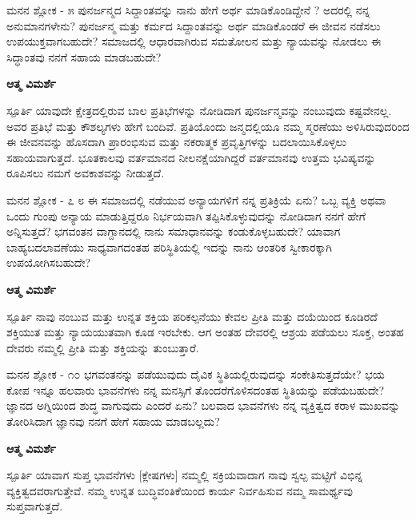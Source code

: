 \newpage
\begin{mananam}{\mananamfont \large ಮನನ ಶ್ಲೋಕ - ೫}
\footnotesize \mananamtext ಪುನರ್ಜನ್ಮದ ಸಿದ್ದಾಂತವನ್ನು ನಾನು ಹೇಗೆ ಅರ್ಥ ಮಾಡಿಕೊಂಡಿದ್ದೇನೆ ? ಅದರಲ್ಲಿ ನನ್ನ ಅನುಮಾನಗಳೇನು?  ಪುನರ್ಜನ್ಮ ಮತ್ತು ಕರ್ಮದ ಸಿದ್ದಾಂತವನ್ನು ಅರ್ಥ ಮಾಡಿಕೊಂಡರೆ ಈ ಜೀವನ ನಡೆಸಲು ಉಪಯುಕ್ತವಾಗಬಹುದೇ? ಸಮಾಜದಲ್ಲಿ ಆಧಾರವಾಗಿರುವ ಸಮತೋಲನ ಮತ್ತು ನ್ಯಾಯವನ್ನು ನೋಡಲು ಈ ಸಿದ್ಧಾಂತವು ನನಗೆ ಸಹಾಯ ಮಾಡಬಹುದೇ?
\end{mananam}
\WritingHand\enspace\textbf{ಆತ್ಮ ವಿಮರ್ಶೆ}\\
\begin{inspiration}{\mananamfont \large ಸ್ಪೂರ್ತಿ}
\footnotesize \mananamtext ಯಾವುದೇ ಕ್ಷೇತ್ರದಲ್ಲಿರುವ ಬಾಲ ಪ್ರತಿಭೆಗಳನ್ನು ನೋಡಿದಾಗ ಪುನರ್ಜನ್ಮವನ್ನು ನಂಬುವುದು ಕಷ್ಟವೇನಲ್ಲ. ಅವರ ಪ್ರತಿಭೆ ಮತ್ತು ಕೌಶಲ್ಯಗಳು ಹೇಗೆ ಬಂದಿವೆ. ಪ್ರತಿಯೊಂದು ಜನ್ಮದಲ್ಲಿಯೂ ನಮ್ಮ ಸ್ಮರಣೆಯು ಅಳಿಸಿರುವುದರಿಂದ ಈ ಜೀವನವನ್ನು ಹೊಸದಾಗಿ ಪ್ರಾರಂಭಿಸುವ ಮತ್ತು ನಕರಾತ್ಮಕ ಪ್ರವೃತ್ತಿಗಳನ್ನು ಬದಲಾಯಿಸಿಕೊಳ್ಳಲು ಸಹಾಯವಾಗುತ್ತದೆ. ಭೂತಕಾಲವು ವರ್ತಮಾನದ ನೀಲನಕ್ಷೆಯಾಗಿದ್ದರೆ ವರ್ತಮಾನವು ಉತ್ತಮ ಭವಿಷ್ಯವನ್ನು ರೂಪಿಸಲು ನಮಗೆ ಅವಕಾಶವನ್ನು ನೀಡುತ್ತದೆ.\\
\end{inspiration}
\newpage
\newpage
\begin{mananam}{\mananamfont \large ಮನನ ಶ್ಲೋಕ - ೭ ೮}
\footnotesize \mananamtext ಈ ಸಮಾಜದಲ್ಲಿ ನಡೆಯುವ ಅನ್ಯಾಯಗಳಿಗೆ ನನ್ನ ಪ್ರತಿಕ್ರಿಯೆ ಏನು? ಒಬ್ಬ ವ್ಯಕ್ತಿ ಅಥವಾ ಒಂದು ಗುಂಪು ಅನ್ಯಾಯ ಮಾಡುತ್ತಿದ್ದರೂ ನಿರ್ಭಯವಾಗಿ ತಪ್ಪಿಸಿಕೊಳ್ಳುವುದನ್ನು ನೋಡಿದಾಗ ನನಗೆ ಹೇಗೆ ಅನ್ನಿಸುತ್ತದೆ? ಭಗವಂತನ  ವಾಗ್ದಾನದಲ್ಲಿ ನಾನು ಸಮಾಧಾನವನ್ನು ಕಂಡುಕೊಳ್ಳಬಹುದೇ? ಯಾವಾಗ ಬಾಹ್ಯಬದಲಾವಣೆಯು ಸಾಧ್ಯವಾಗದಂತಹ ಪರಿಸ್ಥಿತಿಯಲ್ಲಿ ಇದನ್ನು ನಾನು ಆಂತರಿಕ ಸ್ವೀಕಾರಕ್ಕಾಗಿ ಉಪಯೋಗಿಸಬಹುದೇ?
\end{mananam}
\WritingHand\enspace\textbf{ಆತ್ಮ ವಿಮರ್ಶೆ}\\
\begin{inspiration}{\mananamfont \large ಸ್ಪೂರ್ತಿ}
\mananamtext ನಾವು ನಂಬುವ ಮತ್ತು ಉನ್ನತ ಶಕ್ತಿಯ ಪರಿಕಲ್ಪನೆಯು ಕೇವಲ ಪ್ರೀತಿ ಮತ್ತು ದಯೆಯಿಂದ ಕೂಡಿರದೆ ಶಕ್ತಿಯುತ ಮತ್ತು ನ್ಯಾಯಯುತವಾಗಿ ಕೂಡ ಇರಬೇಕು. ಆಗ ಅಂತಹ ದೇವರಲ್ಲಿ ಆಶ್ರಯ ಪಡೆಯಲು  ಸೂಕ್ತ, ಅಂತಹ ದೇವರು ನಮ್ಮಲ್ಲಿ ಪ್ರೀತಿ ಮತ್ತು ಶಕ್ತಿಯನ್ನು ತುಂಬುತ್ತಾರೆ.
\end{inspiration}
\newpage

\begin{mananam}{\mananamfont \large ಮನನ ಶ್ಲೋಕ - ೧೦}
\mananamtext ಭಗವಂತನನ್ನು ಪಡೆಯುವುದು ದೈವಿಕ ಸ್ಥಿತಿಯಲ್ಲಿರುವುದನ್ನು ಸಂಕೇತಿಸುತ್ತದೆಯೇ? ಭಯ ಕೋಪ ಇನ್ನೂ ಹಲವಾರು ಭಾವನೆಗಳು ನನ್ನ ಮನಸ್ಸಿಗೆ ತೊಂದರೆಗೊಳಿಸದಂತಹ ಸ್ಥಿತಿಯನ್ನು ಪಡೆಯಬಹುದೇ? ಜ್ಞಾನದ ಅಗ್ನಿಯಿಂದ ಶುದ್ಧ ವಾಗುವುದು ಎಂದರೆ ಏನು? ಬಲವಾದ ಭಾವನೆಗಳು ನನ್ನ ವ್ಯಕ್ತಿತ್ವದ ಕರಾಳ ಮುಖವನ್ನು ತೋರಿಸಿದಾಗ ಜ್ಞಾನವು ನನಗೆ ಹೇಗೆ ಸಹಾಯ ಮಾಡಬಲ್ಲದು?
\end{mananam}
\WritingHand\enspace\textbf{ಆತ್ಮ ವಿಮರ್ಶೆ}\\
\begin{inspiration}{\mananamfont \large ಸ್ಪೂರ್ತಿ}
\footnotesize \mananamtext ಯಾವಾಗ ಸುಪ್ತ ಭಾವನೆಗಳು [ಕ್ಲೇಷಗಳು] ನಮ್ಮಲ್ಲಿ ಸಕ್ರಿಯವಾದಾಗ ನಾವು ಸ್ವಲ್ಪ ಮಟ್ಟಿಗೆ ವಿಭಿನ್ನ ವ್ಯಕ್ತಿತ್ವದವರಾಗುತ್ತೇವೆ. ನಮ್ಮ ಉನ್ನತ ಬುದ್ಧಿವಂತಿಕೆಯಿಂದ ಕಾರ್ಯ ನಿರ್ವಹಿಸುವ ನಮ್ಮ  ಸಾಮರ್ಥ್ಯವು ಸುಪ್ತವಾಗುತ್ತದೆ.
\end{inspiration}
\newpage

